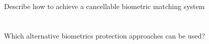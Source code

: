 \begin{questions}
\begin{parts}
  \part{} Describe how to achieve a cancellable biometric matching system
  \part{} Which alternative biometrics protection approaches can be used?
  \end{parts}
\end{questions}

